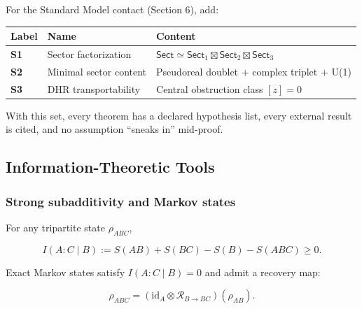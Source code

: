 \documentclass[11pt,a4paper]{article}
\theoremstyle{remark}
\begin{document}
For the Standard Model contact (Section 6), add:

{\def\LTcaptype{none} %
\begin{longtable}[]{@{}
  >{\raggedright\arraybackslash}p{}
  >{\raggedright\arraybackslash}p{}
  >{\raggedright\arraybackslash}p{}@{}}
\toprule\noalign{}
\begin{minipage}[b]{\linewidth}\raggedright
Label
\end{minipage} & \begin{minipage}[b]{\linewidth}\raggedright
Name
\end{minipage} & \begin{minipage}[b]{\linewidth}\raggedright
Content
\end{minipage} \\
\midrule\noalign{}
\endhead
\bottomrule\noalign{}
\endlastfoot
\textbf{S1} & Sector factorization & \(\mathsf{Sect} \simeq \mathsf{Sect}_1 \boxtimes \mathsf{Sect}_2 \boxtimes \mathsf{Sect}_3\) \\
\textbf{S2} & Minimal sector content & Pseudoreal doublet + complex triplet + U(1) \\
\textbf{S3} & DHR transportability & Central obstruction class \([z] = 0\) \\
\end{longtable}
}

With this set, every theorem has a declared hypothesis list, every external
result is cited, and no assumption ``sneaks in'' mid-proof.

\subsection{Information-Theoretic Tools}\label{information-theoretic-tools}

\subsubsection{Strong subadditivity and Markov states}\label{strong-subadditivity-and-markov-states}

For any tripartite state \(\rho_{ABC}\),

\[
I(A:C \mid B) := S(AB) + S(BC) - S(B) - S(ABC) \ge 0.
\]

Exact Markov states satisfy \(I(A:C \mid B) = 0\) and admit a recovery map:

\[
\rho_{ABC} = (\mathrm{id}_A \otimes \mathcal R_{B\to BC})(\rho_{AB}).
\]
\end{document}
